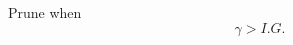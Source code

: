 \documentclass[preview]{standalone}
\begin{document}
\begin{center}
Prune when $$\gamma > I.G.$$
\end{center}
\end{document}
